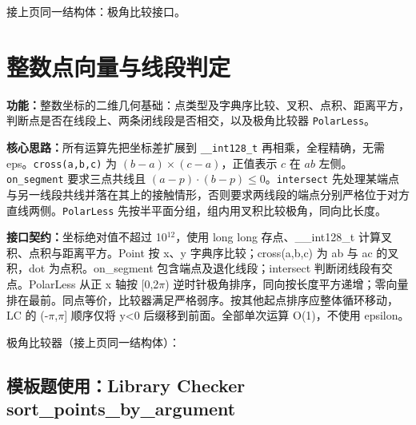 \newpage

\noindent 接上页同一结构体：极角比较接口。



\newpage

\section{整数点向量与线段判定}\label{compact-IntegerPlane}

\noindent\textbf{功能：}\allowbreak 整数坐标的二维几何基础：点类型及字典序比较、叉积、点积、距离平方，判断点是否在线段上、两条闭线段是否相交，以及极角比较器 \texttt{PolarLess}。

\textbf{核心思路：}\allowbreak 所有运算先把坐标差扩展到 \texttt{\_\_int128\_t} 再相乘，全程精确，无需 eps。\texttt{cross(a,b,c)} 为 $(b-a)\times(c-a)$，正值表示 $c$ 在 $ab$ 左侧。\texttt{on\_segment} 要求三点共线且 $(a-p)\cdot(b-p)\le0$。\texttt{intersect} 先处理某端点与另一线段共线并落在其上的接触情形，否则要求两线段的端点分别严格位于对方直线两侧。\texttt{PolarLess} 先按半平面分组，组内用叉积比较极角，同向比长度。



{\sloppy{}\noindent\textbf{接口契约：}坐标绝对值不超过 10$^{12}$，使用 long long 存点、\_\_int128\_t 计算叉积、点积与距离平方。Point 按 x、y 字典序比较；cross(a,b,c) 为 ab 与 ac 的叉积，dot 为点积。on\_segment 包含端点及退化线段；intersect 判断闭线段有交点。PolarLess 从正 x 轴按 [0,2$\pi$) 逆时针极角排序，同向按长度平方递增；零向量排在最前。同点等价，比较器满足严格弱序。按其他起点排序应整体循环移动，LC 的 (-$\pi$,$\pi$] 顺序仅将 y<0 后缀移到前面。全部单次运算 O(1)，不使用 epsilon。\par}

\Needspace{624pt}



\newpage

\noindent 极角比较器（接上页同一结构体）：



\Needspace{329pt}

\subsection*{模板题使用：Library Checker sort\_points\_by\_argument}

